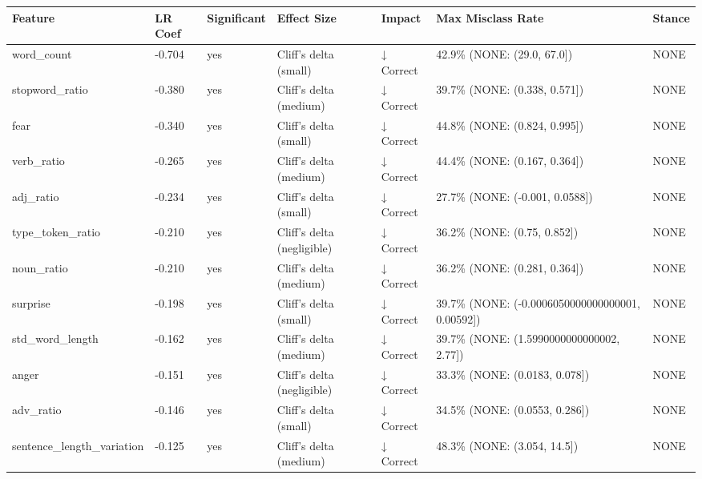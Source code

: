 \begin{tabular}{lllllll}
\toprule
Feature & LR Coef & Significant & Effect Size & Impact & Max Misclass Rate & Stance \\
\midrule
word\_count & -0.704 & yes & Cliff's delta (small) & ↓ Correct & 42.9\% (NONE: (29.0, 67.0]) & NONE \\
stopword\_ratio & -0.380 & yes & Cliff's delta (medium) & ↓ Correct & 39.7\% (NONE: (0.338, 0.571]) & NONE \\
fear & -0.340 & yes & Cliff's delta (small) & ↓ Correct & 44.8\% (NONE: (0.824, 0.995]) & NONE \\
verb\_ratio & -0.265 & yes & Cliff's delta (medium) & ↓ Correct & 44.4\% (NONE: (0.167, 0.364]) & NONE \\
adj\_ratio & -0.234 & yes & Cliff's delta (small) & ↓ Correct & 27.7\% (NONE: (-0.001, 0.0588]) & NONE \\
type\_token\_ratio & -0.210 & yes & Cliff's delta (negligible) & ↓ Correct & 36.2\% (NONE: (0.75, 0.852]) & NONE \\
noun\_ratio & -0.210 & yes & Cliff's delta (medium) & ↓ Correct & 36.2\% (NONE: (0.281, 0.364]) & NONE \\
surprise & -0.198 & yes & Cliff's delta (small) & ↓ Correct & 39.7\% (NONE: (-0.0006050000000000001, 0.00592]) & NONE \\
std\_word\_length & -0.162 & yes & Cliff's delta (medium) & ↓ Correct & 39.7\% (NONE: (1.5990000000000002, 2.77]) & NONE \\
anger & -0.151 & yes & Cliff's delta (negligible) & ↓ Correct & 33.3\% (NONE: (0.0183, 0.078]) & NONE \\
adv\_ratio & -0.146 & yes & Cliff's delta (small) & ↓ Correct & 34.5\% (NONE: (0.0553, 0.286]) & NONE \\
sentence\_length\_variation & -0.125 & yes & Cliff's delta (medium) & ↓ Correct & 48.3\% (NONE: (3.054, 14.5]) & NONE \\
\bottomrule
\end{tabular}
